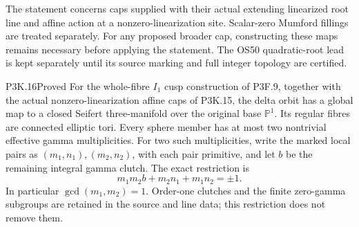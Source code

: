 The statement concerns caps supplied with their actual extending
linearized root line and affine action at a nonzero-linearization
site.  Scalar-zero Mumford fillings are treated separately.  For any proposed broader
cap, constructing these maps remains necessary before applying
the statement.  The OS50 quadratic-root lead is kept separately
until its source marking and full integer topology are certified.

\begin{statement}{P3K.16}{Proved}
For the whole-fibre \(I_1\) cusp construction of P3F.9, together
with the actual nonzero-linearization affine caps of P3K.15, the
delta orbit has a global map to a closed Seifert three-manifold
over the original base \(\mathbb P^1\).  Its regular fibres are
connected elliptic tori.  Every sphere member has at most two
nontrivial effective gamma multiplicities.  For two such
multiplicities, write the marked local pairs as
\((m_1,n_1),(m_2,n_2)\), with each pair primitive, and let
\(b\) be the remaining integral gamma clutch.  The exact restriction is
\[
       m_1m_2b+m_2n_1+m_1n_2=\pm1.                 \tag{P3K.16.1}
\]
In particular \(\gcd(m_1,m_2)=1\).  Order-one clutches and the
finite zero-gamma subgroups are retained in the source and line
data; this restriction does not remove them.
\end{statement}

